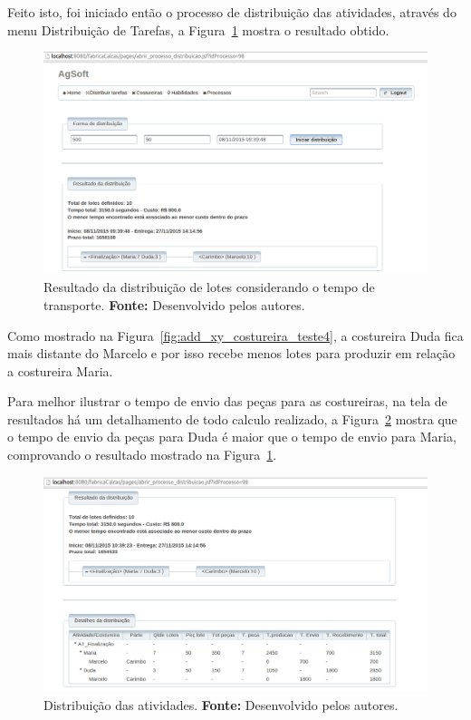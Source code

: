 \par Feito isto, foi iniciado então o processo de distribuição das atividades,
através do menu Distribuição de Tarefas, a Figura~\ref{fig:resultado_transporte_teste4} mostra o resultado obtido.


\begin{figure}[h!]
	\centerline{\includegraphics[scale=0.3]{./imagens/resultado_transporte_teste4.png}}
	\caption[Resultado da distribuição de lotes considerando o tempo de transporte.]
	{Resultado da distribuição de lotes considerando o tempo de transporte. \textbf{Fonte:} Desenvolvido pelos
	autores.}
	\label{fig:resultado_transporte_teste4}
\end{figure}

\par Como mostrado na Figura~\ref{fig:add_xy_costureira_teste4}, a costureira
Duda fica mais distante do Marcelo e por isso recebe menos lotes para produzir em
relação a costureira Maria.

\par Para melhor ilustrar o tempo de envio das peças para as costureiras, na tela
de resultados há um detalhamento de todo calculo realizado, a Figura~\ref{fig:detalhameneto_transporte_teste4} 
mostra que o tempo de envio da peças para Duda é 
maior que o tempo de envio para Maria, comprovando o resultado mostrado na
Figura~\ref{fig:resultado_transporte_teste4}.

\begin{figure}[h!]
	\centerline{\includegraphics[scale=0.3]{./imagens/detalhamento_transporte_teste4.png}}
	\caption[Distribuição das atividades.] 
	{Distribuição das atividades. \textbf{Fonte:} Desenvolvido pelos autores.}
	\label{fig:detalhameneto_transporte_teste4}
\end{figure}


